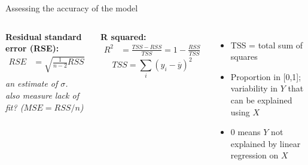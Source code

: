 \documentclass[aspectratio=169,usenames,dvipsnames]{beamer}
\newcommand{\InstructorNotes}[1]{\textit{\color{orange}#1}}
\newcommand{\InstructorList}[1]{
\begin{itemize}
	\color{orange}
	#1
\end{itemize}
}
\begin{document}
\begin{frame}[c]{Assessing the accuracy of the model}
	\centering
\begin{columns}
\textbf{Residual standard error (RSE):}
\begin{align*}
	RSE &= \sqrt{ \frac{1}{n-2} RSS}\\
\end{align*}
\InstructorNotes{an estimate of $\sigma$. \\also measure lack of fit? ($MSE=RSS/n$) }




\textbf{R squared:}
\begin{align*}
	R^2 &= \frac{TSS-RSS}{TSS} = 1-\frac{RSS}{TSS}
\end{align*}
\begin{equation*}
	TSS = \sum_i (y_i - \overline y)^2
\end{equation*}
\InstructorList{
\item TSS = total sum of squares
\item Proportion in [0,1]; variability in $Y$ that can be explained using $X$
\item 0 means $Y$ not explained by linear regression on $X$}
\end{columns}
\vspace{\fill}

\end{frame}



\end{document}
